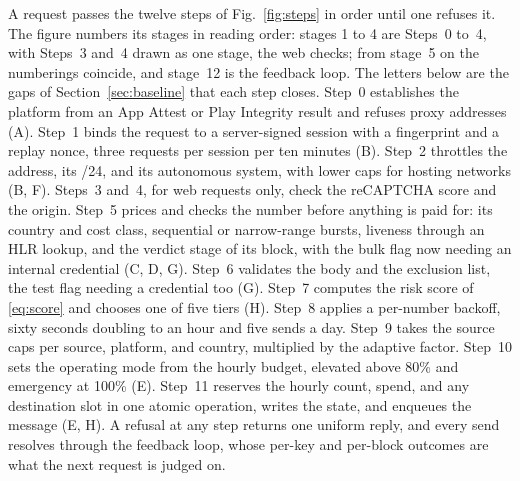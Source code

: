 \documentclass{IEEEoj}
\begin{document}
A request passes the twelve steps of Fig.~\ref{fig:steps} in order until one refuses it. The figure numbers its stages in reading order: stages 1 to 4 are Steps~0 to~4, with Steps~3 and~4 drawn as one stage, the web checks; from stage~5 on the numberings coincide, and stage~12 is the feedback loop. The letters below are the gaps of Section~\ref{sec:baseline} that each step closes. Step~0 establishes the platform from an App Attest or Play Integrity result and refuses proxy addresses (A). Step~1 binds the request to a server-signed session with a fingerprint and a replay nonce, three requests per session per ten minutes (B). Step~2 throttles the address, its /24, and its autonomous system, with lower caps for hosting networks (B, F). Steps~3 and~4, for web requests only, check the reCAPTCHA score and the origin. Step~5 prices and checks the number before anything is paid for: its country and cost class, sequential or narrow-range bursts, liveness through an HLR lookup, and the verdict stage of its block, with the bulk flag now needing an internal credential (C, D, G). Step~6 validates the body and the exclusion list, the test flag needing a credential too (G). Step~7 computes the risk score of \eqref{eq:score} and chooses one of five tiers (H). Step~8 applies a per-number backoff, sixty seconds doubling to an hour and five sends a day. Step~9 takes the source caps per source, platform, and country, multiplied by the adaptive factor. Step~10 sets the operating mode from the hourly budget, elevated above 80\% and emergency at 100\% (E). Step~11 reserves the hourly count, spend, and any destination slot in one atomic operation, writes the state, and enqueues the message (E, H). A refusal at any step returns one uniform reply, and every send resolves through the feedback loop, whose per-key and per-block outcomes are what the next request is judged on.
\end{document}
